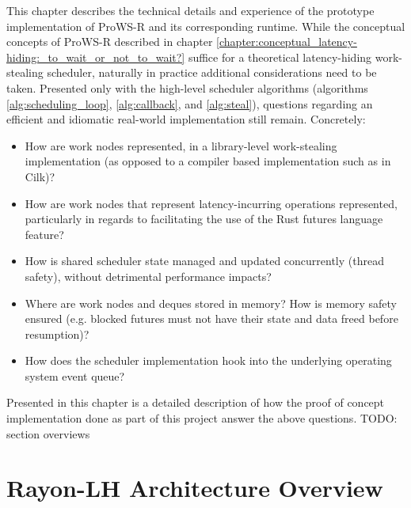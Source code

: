 \documentclass[bsc,frontabs,singlespacing,parskip,deptreport,normalheadings]{infthesis}
\begin{document}
This chapter describes the technical details and experience of the prototype
implementation of ProWS-R and its corresponding runtime. While the conceptual
concepts of ProWS-R described in chapter
\ref{chapter:conceptual_latency-hiding:_to_wait_or_not_to_wait?} suffice for a
theoretical latency-hiding work-stealing scheduler, naturally in practice
additional considerations need to be taken. Presented only with the high-level
scheduler algorithms (algorithms \ref{alg:scheduling_loop}, \ref{alg:callback},
and \ref{alg:steal}), questions regarding an efficient and idiomatic real-world
implementation still remain. Concretely:

\begin{itemize}
    \item How are work nodes represented, in a library-level work-stealing
        implementation (as opposed to a compiler based implementation such as in
        Cilk)?
    \item How are work nodes that represent latency-incurring operations
        represented, particularly in regards to facilitating the use of the Rust
        futures language feature?
    \item How is shared scheduler state managed and updated concurrently (thread
        safety), without detrimental performance impacts?
    \item Where are work nodes and deques stored in memory? How is memory safety
        ensured (e.g. blocked futures must not have their state and data freed
        before resumption)?
    \item How does the scheduler implementation hook into the underlying
        operating system event queue?
\end{itemize}

Presented in this chapter is a detailed description of how the proof of concept
implementation done as part of this project answer the above questions. TODO:
section overviews

\section{Rayon-LH Architecture Overview}
\end{document}
